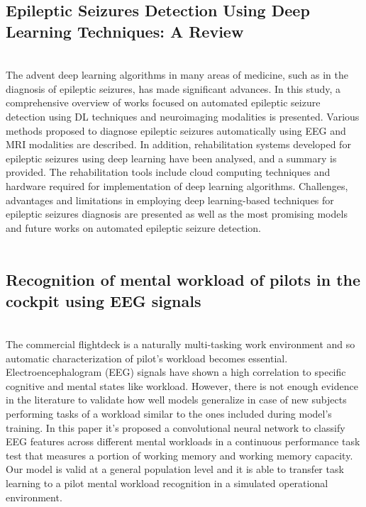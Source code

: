\subsection{Epileptic Seizures Detection Using Deep Learning Techniques: A Review}
\leavevmode\\
The advent deep learning algorithms in many areas of medicine, such as in the diagnosis of epileptic seizures, has made significant advances. In this study, a comprehensive overview of works focused on automated epileptic seizure detection using DL techniques and neuroimaging modalities is presented. Various methods proposed to diagnose epileptic seizures automatically using EEG and MRI modalities are described. In addition, rehabilitation systems developed for epileptic seizures using deep learning have been analysed, and a summary is provided. The rehabilitation tools include cloud computing techniques and hardware required for implementation of deep learning algorithms. Challenges, advantages and limitations in employing deep learning-based techniques for epileptic seizures diagnosis are presented as well as the most promising models and future works on automated epileptic seizure detection.
\\\\

\subsection{Recognition of mental workload of pilots in the cockpit using EEG signals}
\leavevmode\\
The commercial flightdeck is a naturally multi-tasking work environment and so automatic characterization of pilot’s workload becomes essential. Electroencephalogram (EEG) signals have shown a high correlation to specific cognitive and mental states like workload. However, there is not enough evidence in the literature to validate how well models generalize in case of new subjects performing tasks of a workload similar to the ones included during model’s training. In this paper it’s proposed a convolutional neural network to classify EEG features across different mental workloads in a continuous performance task test that measures a portion of working memory and working memory capacity. Our model is valid at a general population level and it is able to transfer task learning to a pilot mental workload recognition in a simulated operational environment.
\\\\
